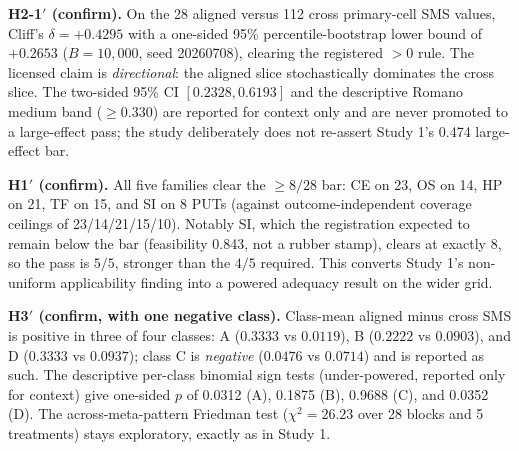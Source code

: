 \documentclass[manuscript,screen,review]{acmart}
\begin{document}
\textbf{H2-1\('\) (confirm).} On the 28 aligned versus 112 cross
primary-cell SMS values, Cliff's \(\delta = +0.4295\) with a one-sided
95\% percentile-bootstrap lower bound of \(+0.2653\) (\(B = 10{,}000\),
seed 20260708), clearing the registered \(>0\) rule. The licensed claim
is \emph{directional}: the aligned slice stochastically dominates the
cross slice. The two-sided 95\% CI \([0.2328, 0.6193]\) and the
descriptive Romano medium band (\(\geq 0.330\)) are reported for context
only and are never promoted to a large-effect pass; the study
deliberately does not re-assert Study 1's 0.474 large-effect bar.

\textbf{H1\('\) (confirm).} All five families clear the \(\geq 8/28\)
bar: CE on 23, OS on 14, HP on 21, TF on 15, and SI on 8 PUTs (against
outcome-independent coverage ceilings of 23/14/21/15/10). Notably SI,
which the registration expected to remain below the bar (feasibility
0.843, not a rubber stamp), clears at exactly 8, so the pass is
\(5/5\), stronger than the \(4/5\) required. This converts Study 1's
non-uniform applicability finding into a powered adequacy result on the
wider grid.

\textbf{H3\('\) (confirm, with one negative class).} Class-mean aligned
minus cross SMS is positive in three of four classes: A
(\(0.3333\) vs \(0.0119\)), B (\(0.2222\) vs \(0.0903\)), and D
(\(0.3333\) vs \(0.0937\)); class C is \emph{negative}
(\(0.0476\) vs \(0.0714\)) and is reported as such. The descriptive
per-class binomial sign tests (under-powered, reported only for context)
give one-sided \(p\) of 0.0312 (A), 0.1875 (B), 0.9688 (C), and 0.0352
(D). The across-meta-pattern Friedman test
(\(\chi^2 = 26.23\) over 28 blocks and 5 treatments) stays exploratory,
exactly as in Study 1.
\end{document}

